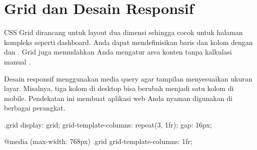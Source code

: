\section{Grid dan Desain Responsif}
CSS Grid dirancang untuk layout dua dimensi sehingga cocok untuk halaman kompleks seperti dashboard. Anda dapat mendefinisikan baris dan kolom dengan  dan . Grid juga memudahkan Anda mengatur area konten tanpa kalkulasi manual \cite{webdevCss}.

Desain responsif menggunakan media query agar tampilan menyesuaikan ukuran layar. Misalnya, tiga kolom di desktop bisa berubah menjadi satu kolom di mobile. Pendekatan ini membuat aplikasi web Anda nyaman digunakan di berbagai perangkat.

\begin{webcode}[language=CSS, caption={Contoh Grid dan Media Query}]
.grid {
  display: grid;
  grid-template-columns: repeat(3, 1fr);
  gap: 16px;
}

@media (max-width: 768px) {
  .grid {
    grid-template-columns: 1fr;
  }
}
\end{webcode}

